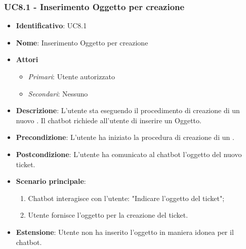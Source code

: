 \subsubsection{UC8.1 - Inserimento Oggetto per creazione }
\begin{itemize}
	\item \textbf{Identificativo}: UC8.1
	\item \textbf{Nome}: Inserimento Oggetto per creazione  
	\item \textbf{Attori}
	\begin{itemize} 
		\item \textit{Primari}: Utente autorizzato
		\item \textit{Secondari}: Nessuno
	\end{itemize}
	\item \textbf{Descrizione}: L'utente sta eseguendo il procedimento di creazione di un nuovo . Il chatbot richiede all'utente di inserire un Oggetto. 
	\item \textbf{Precondizione}: L'utente ha iniziato la procedura di creazione di un .
	\item \textbf{Postcondizione}: L'utente ha comunicato al chatbot l'oggetto del nuovo ticket.
	\item \textbf{Scenario principale}: \begin{enumerate}
		\item Chatbot interagisce con l'utente: "Indicare l'oggetto del ticket";
		\item Utente fornisce l'oggetto per la creazione del ticket.
	\end{enumerate}
	\item \textbf{Estensione}: Utente non ha inserito l'oggetto in maniera idonea per il chatbot.
		
\end{itemize}
